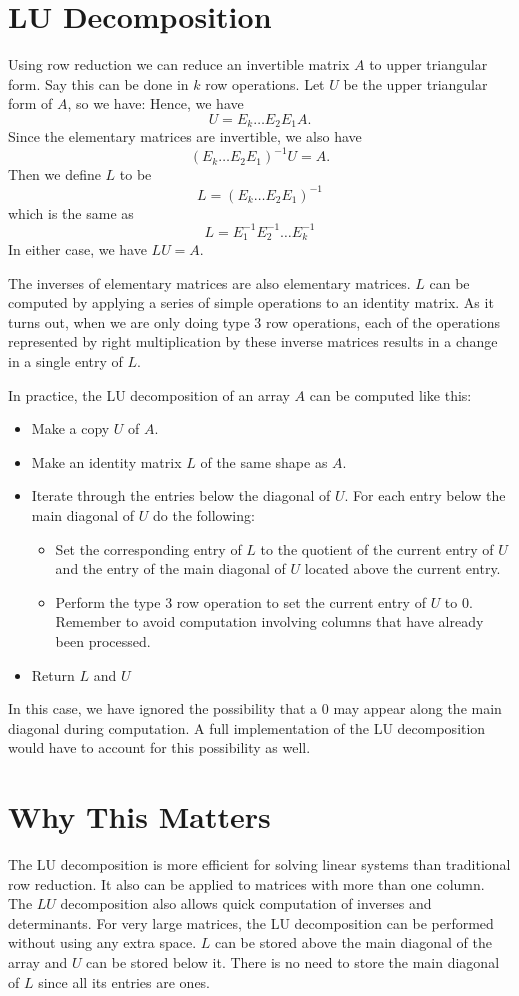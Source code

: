 \section*{LU Decomposition}
Using row reduction we can reduce an invertible matrix $A$ to upper triangular form.
Say this can be done in $k$ row operations.
Let $U$ be the upper triangular form of $A$, so we have:
Hence, we have
\[
U = E_k \dots E_2 E_1 A.
\]
Since the elementary matrices are invertible, we also have
\[
(E_k \dots E_2 E_1)^{-1} U =  A.
\]
Then we define $L$ to be
\[
L = (E_k \dots E_2 E_1)^{-1}
\]
which is the same as
\[
L = E_1^{-1} E_2^{-1} \dots E_k^{-1}
\]
In either case, we have $L U = A$.

The inverses of elementary matrices are also elementary matrices. $L$ can be computed by applying a series of simple operations to an identity matrix.
As it turns out, when we are only doing type 3 row operations, each of the operations represented by right multiplication by these inverse matrices results in a change in a single entry of $L$.

In practice, the LU decomposition of an array $A$ can be computed like this:
\begin{itemize}
\item Make a copy $U$ of $A$.
\item Make an identity matrix $L$ of the same shape as $A$.
\item Iterate through the entries below the diagonal of $U$.
For each entry below the main diagonal of $U$ do the following:
	\begin{itemize}
	\item Set the corresponding entry of $L$ to the quotient of the current entry of $U$ and the entry of the main diagonal of $U$ located above the current entry.
	\item Perform the type 3 row operation to set the current entry of $U$ to 0.
		Remember to avoid computation involving columns that have already been processed.
	\end{itemize}
\item Return $L$ and $U$
\end{itemize}
In this case, we have ignored the possibility that a 0 may appear along the main diagonal during computation.
A full implementation of the LU decomposition would have to account for this possibility as well.

\section*{Why This Matters}
The LU decomposition is more efficient for solving linear systems than traditional row reduction.
It also can be applied to matrices with more than one column.
The $LU$ decomposition also allows quick computation of inverses and determinants.
For very large matrices, the LU decomposition can be performed without using any extra space.
$L$ can be stored above the main diagonal of the array and $U$ can be stored below it.
There is no need to store the main diagonal of $L$ since all its entries are ones.


